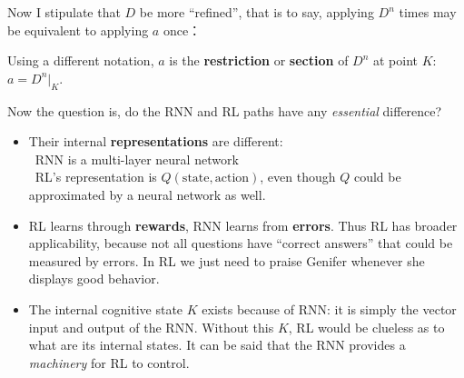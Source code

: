 \documentclass[12pt]{article}
\newcommand{\tab}{\hspace*{1cm}}
\newcommand{\dashh}{\textemdash~}
\begin{document}
Now I stipulate that $D$ be more ``refined'', that is to say, applying $D^n$ times may be equivalent to applying $a$ once：
\begin{figure}[H]
\centering
{}
\end{figure}
Using a different notation, $a$ is the \textbf{restriction} or \textbf{section} of $D^n$ at point $K$: $a = D^n|_K$.

Now the question is, do the RNN and RL paths have any \textit{essential} difference?
\begin{itemize}
\item Their internal \textbf{representations} are different:\\
\dashh RNN is a multi-layer neural network\\
\dashh RL's representation is $Q(\mbox{state},\mbox{action})$, even though $Q$ could be approximated by a neural network as well.
\item RL learns through \textbf{rewards}, RNN learns from \textbf{errors}.  Thus RL has broader applicability, because not all questions have ``correct answers'' that could be measured by errors.  In RL we just need to praise Genifer whenever she displays good behavior.
\item The internal cognitive state $K$ exists because of RNN:  it is simply the vector input and output of the RNN.  Without this $K$, RL would be clueless as to what are its internal states.  It can be said that the RNN provides a \textit{machinery} for RL to control.
\end{itemize}


\end{document}

